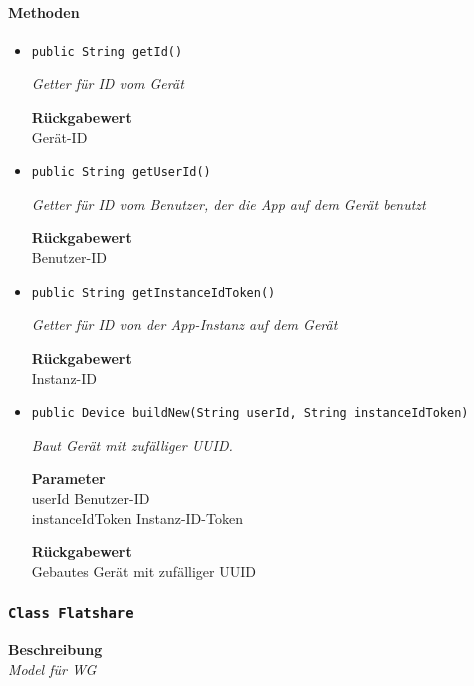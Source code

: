      \paragraph*{Methoden}
     \begin{itemize}
     	\item{\texttt{public String getId()}}
     	
     	\textit{Getter für ID vom Gerät}
     	
     	
     	
     	\textbf{Rückgabewert} \\
     	Gerät-ID        \item{\texttt{public String getUserId()}}
     	
     	\textit{Getter für ID vom Benutzer, der die App auf dem Gerät benutzt}
     	
     	
     	
     	\textbf{Rückgabewert} \\
     	Benutzer-ID        \item{\texttt{public String getInstanceIdToken()}}
     	
     	\textit{Getter für ID von der App-Instanz auf dem Gerät}
     	
     	
     	
     	\textbf{Rückgabewert} \\
     	Instanz-ID        \item{\texttt{public Device buildNew(String userId, String instanceIdToken)}}
     	
     	\textit{Baut Gerät mit zufälliger UUID.}
     	
     	\textbf{Parameter} \\
     	userId Benutzer-ID\\
     	instanceIdToken Instanz-ID-Token
     	
     	\textbf{Rückgabewert} \\
     	Gebautes Gerät mit zufälliger UUID
     \end{itemize}
     \subsubsection{\texttt{Class Flatshare}}
     \textbf{Beschreibung} \\
     \textit{Model für WG}
